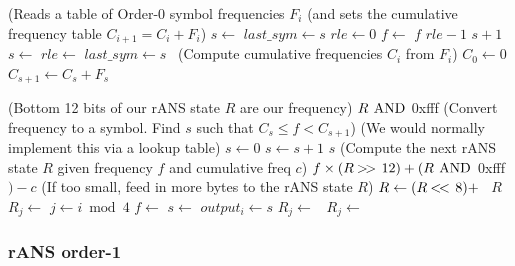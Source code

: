 \documentclass[a4paper]{article}
\begin{document}
\begin{algorithmic}[1]
\Statex (Reads a table of Order-0 symbol frequencies $F_i$
\Statex (and sets the cumulative frequency table $C_{i+1} = C_i+F_i$)
\State $s \gets$ 
\State $last\_sym \gets s$
\State $rle \gets 0$
\Repeat
  \State $f \gets$ 
  \settowidth{\maxwidth}{$C_s$}
  \State {} $f$
    \settowidth{\maxwidth}{rle\ }
    \State {} $rle-1$
    \State {} $s+1$
  \Else
    \State $s \gets$ 
      \State $rle \gets$ 
    \EndIf
  \EndIf
  \State $last\_sym \gets s$
\Statex \quad\ (Compute cumulative frequencies $C_i$ from $F_i$)
\State $C_0 \gets 0$
  \State $C_{s+1} \gets C_s + F_s$
\EndFor
\EndProcedure

\Statex
\Statex (Bottom 12 bits of our rANS state $R$ are our frequency)
  \State \Return $R\ \bitand$ 0xfff
\EndFunction
\Statex
\Statex (Convert frequency to a symbol. Find $s$ such that $C_s \le f < C_{s+1}$)
\Statex (We would normally implement this via a lookup table)
  \State $s \gets 0$
    \State $s \gets s+1$
  \EndWhile
  \State \Return $s$
\EndFunction
\Statex
\Statex (Compute the next rANS state $R$ given frequency $f$ and cumulative freq $c$)
  \State \Return $f \times (R \shiftr 12) + (R\ \bitand$ 0xfff$) - c$
\EndFunction
\Statex
\Statex (If too small, feed in more bytes to the rANS state $R$)
    \State $R \gets (R \mathbin{<\mkern-3mu<\,} 8) +$\ 
  \EndWhile
  \State \Return $R$
\EndFunction
\Statex
{}
  \State {}
    \State $R_j \gets$ 
  \EndFor
    \State $j \gets i \bmod 4$
    \State $f \gets$ 
    \State $s \gets$ 
    \State $output_i \gets s$
    \State $R_j \gets$\ 
    \State $R_j \gets$\ 
  \EndFor
\EndProcedure
\end{algorithmic}

\subsubsection*{rANS order-1}
\end{document}
